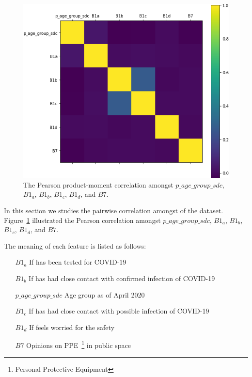 \documentclass[11pt,twocolumn,letterpaper]{article}
\begin{document}
\begin{figure}[htb]
    \centering
    \includegraphics[width=1\linewidth]{assests/data.png}
    \caption{The Pearson product-moment correlation amongst $p\_age\_group\_sdc$, $B1_a$, $B1_b$, $B1_c$, $B1_d$, and $B7$.}
    \label{fig:data}\vspace{-2.5mm}
\end{figure}

In this section we studies the pairwise correlation amongst of the dataset.
Figure~\ref{fig:data} illustrated the Pearson correlation amongst $p\_age\_group\_sdc$, $B1_a$, $B1_b$, $B1_c$, $B1_d$, and $B7$.

The meaning of each feature is listed as follows:

\begin{itemize}
  \vspace{-2.5mm}\item[$B1_a$] If has been tested for COVID-19
  \vspace{-2.5mm}\item[$B1_b$] If has had close contact with confirmed infection of COVID-19
  \vspace{-2.5mm}\item[$p\_age\_group\_sdc$] Age group as of April 2020
  \vspace{-2.5mm}\item[$B1_c$] If has had close contact with possible infection of COVID-19
  \vspace{-2.5mm}\item[$B1_d$] If feels worried for the safety
  \vspace{-2.5mm}\item[$B7$] Opinions on PPE~\footnote{Personal Protective Equipment} in public space
\end{itemize}
\end{document}
